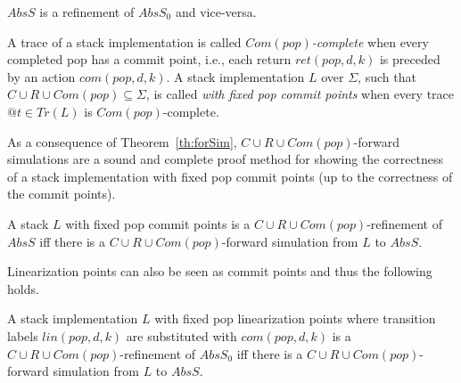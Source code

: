 \vspace{-2mm}
\begin{theorem}\label{th:absImplStack}
$AbsS$ is a refinement of $AbsS_0$ and vice-versa.
\vspace{-2mm}
\end{theorem}

A trace of a stack implementation is called \emph{$Com(pop)$-complete} when every completed pop has a commit point, i.e., each return $ret(pop,d,k)$ is preceded by an action $com(pop,d,k)$. A stack implementation $L$ over $\Sigma$, such that $C\cup R\cup Com(pop)\subseteq \Sigma$, is called \emph{with fixed pop commit points} when every trace $@t\in Tr(L)$ is $Com(pop)$-complete.


As a consequence of Theorem~\ref{th:forSim}, $C\cup R\cup Com(pop)$-forward simulations are a sound and complete proof method for showing the correctness of a stack implementation with fixed pop commit points (up to the correctness of the commit points). 


\vspace{-1.5mm}
\begin{corollary}
A stack $L$ with fixed pop commit points is a $C\cup R\cup Com(pop)$-refinement of $AbsS$ if{f} there is a $C\cup R\cup Com(pop)$-forward simulation from $L$ to $AbsS$.
\vspace{-1.5mm}
\end{corollary}

Linearization points can also be seen as commit points and thus the following holds.

\vspace{-1.5mm}
\begin{corollary}
A stack implementation $L$ with fixed pop linearization points where transition labels $lin(pop,d,k)$ are substituted with $com(pop,d,k)$ is a $C\cup R\cup Com(pop)$-refinement of $AbsS_0$ if{f} there is a $C\cup R\cup Com(pop)$-forward simulation from $L$ to $AbsS$.
\vspace{-1.5mm}
\end{corollary}


\vspace{-6mm}
